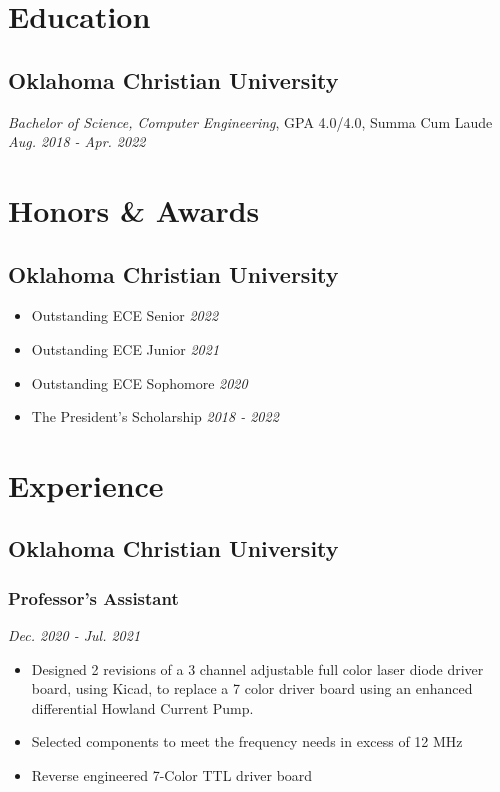\documentclass{article}
\begin{document}
\begin{spacing}{.5}
\section{Education}
	\subsection{Oklahoma Christian University}
		\textit{Bachelor of Science, Computer Engineering}, GPA 4.0/4.0, Summa Cum Laude \hfill \small{\textsl{Aug. 2018 - Apr. 2022}}

\section{Honors \& Awards}
	\subsection{Oklahoma Christian University}
		\begin{itemize}[label=$\bullet$,itemsep=-.75ex]
			\item \large{Outstanding ECE Senior} \hfill \small{\textsl{2022}}
			\item \large{Outstanding ECE Junior} \hfill \small{\textsl{2021}}
			\item \large{Outstanding ECE Sophomore} \hfill \small{\textsl{2020}}
			\item \large{The President's Scholarship} \hfill \small{\textsl{2018 - 2022}}
		\end{itemize}
\section{Experience}
	\subsection{Oklahoma Christian University}
		\subsubsection{\large{Professor's Assistant}} \hfill \small{\textsl{Dec. 2020 - Jul. 2021}}
			\begin{itemize}[label=--,itemsep=-.65ex]
				\item \large{Designed 2 revisions of a 3 channel adjustable full color laser diode driver board, using Kicad, to replace a 7 color driver board using an enhanced differential Howland Current Pump.}
				\item \large{Selected components to meet the frequency needs in excess of 12 MHz}
				\item \large{Reverse engineered 7-Color TTL driver board}
			\end{itemize}

\end{spacing}
\end{document}
